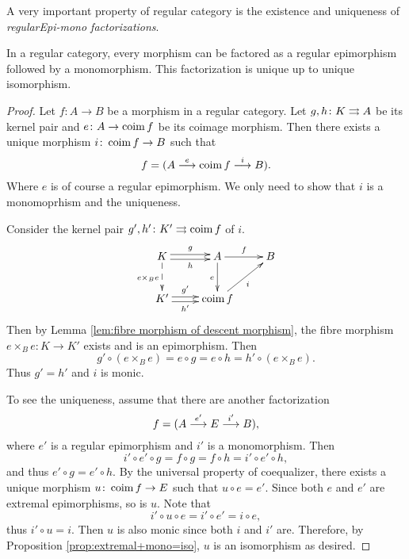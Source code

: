   A very important property of regular category is the existence and uniqueness of \emph{regularEpi-mono factorizations}.
  \begin{thm}\label{thm:regular factorization}
    In a regular category, every morphism can be factored as a regular epimorphism followed by a monomorphism. This factorization is unique up to unique isomorphism.
  \end{thm}
  \begin{proof}
    Let $f\colon A\to B$ be a morphism in a regular category. Let $g,h\colon K\rightrightarrows A$ be its kernel pair and $e\colon A\to\operatorname{coim}{f}$ be its coimage morphism. Then there exists a unique morphism $i\colon\operatorname{coim}{f}\to B$ such that
    \begin{equation*}
      f = (A \stackrel{{e}}{\longrightarrow} \operatorname{coim}{f} \stackrel{{i}}{\longrightarrow} B).
    \end{equation*}
    Where $e$ is of course a regular epimorphism. We only need to show that $i$ is a monomoprhism and the uniqueness.

    Consider the kernel pair $g',h'\colon K'\rightrightarrows\operatorname{coim}{f}$ of $i$.
    \begin{displaymath}
      \xymatrix{
         K\ar@<0.5ex>[r]^-{g}\ar@<-0.5ex>[r]_-{h}\ar@{-->}[d]_{e\times_Be}&A\ar[r]^{f}\ar[d]_{e}&B\\
         K'\ar@<0.5ex>[r]^-{g'}\ar@<-0.5ex>[r]_-{h'}&\coim{f}\ar[ru]_{i}&
      }
    \end{displaymath}
    Then by Lemma \ref{lem:fibre morphism of descent morphism}, the fibre morphism $e\times_Be\colon K\to K'$ exists and is an epimorphism. Then
    \begin{equation*}
      g'\circ (e\times_Be) = e\circ g = e\circ h = h'\circ (e\times_Be).
    \end{equation*}
    Thus $g'=h'$ and $i$ is monic.

    To see the uniqueness, assume that there are another factorization
    \begin{equation*}
      f = (A \stackrel{{e'}}{\longrightarrow} E \stackrel{{i'}}{\longrightarrow} B),
    \end{equation*}
    where $e'$ is a regular epimorphism and $i'$ is a monomorphism. Then
    \begin{equation*}
      i'\circ e'\circ g = f\circ g = f\circ h = i'\circ e'\circ h,
    \end{equation*}
    and thus $e'\circ g = e'\circ h$. By the universal property of coequalizer, there exists a unique morphism $u\colon\operatorname{coim}{f}\to E$ such that $u\circ e = e'$. Since both $e$ and $e'$ are extremal epimorphisms, so is $u$. Note that
    \begin{equation*}
      i'\circ u\circ e = i'\circ e' = i\circ e,
    \end{equation*}
    thus $i'\circ u = i$. Then $u$ is also monic since both $i$ and $i'$ are. Therefore, by Proposition \ref{prop:extremal+mono=iso}, $u$ is an isomorphism as desired.
  \end{proof}

